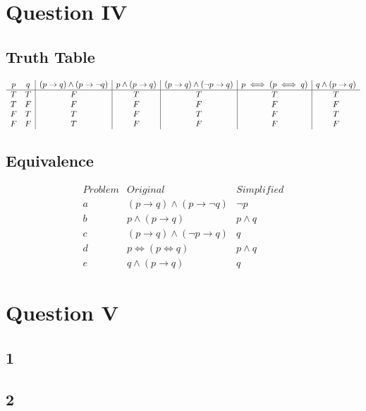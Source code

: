\documentclass{article}
\begin{document}
\section*{Question IV}

\subsection*{Truth Table}
\begin{displaymath}
\begin{array}{c c|c|c|c|c|c} %
p & q & 
(p \rightarrow q) \land (p \rightarrow \neg q) & 
p \land (p \rightarrow q) & 
(p \rightarrow q) \land (\neg p \rightarrow q) &
p \iff (p \iff q) &
q \land (p \rightarrow q)
\\ 
\hline
T & T & F & T & T & T & T \\
T & F & F & F & F & F & F \\
F & T & T & F & T & F & T \\
F & F & T & F & F & F & F 
\end{array}
\end{displaymath}

\subsection*{Equivalence}
\begin{displaymath}
\begin{array}{c|c|c} %
Problem & Original & Simplified \\
\hline
a & (p \rightarrow q) \land (p \rightarrow \neg q) & \neg p \\ 
b & p \land (p \rightarrow q) & p \land q \\
c & (p \rightarrow q) \land (\neg p \rightarrow q) & q \\
d & p \iff (p \iff q) & p \land q \\
e & q \land (p \rightarrow q) & q
\end{array}
\end{displaymath}

\section*{Question V}

\subsection{1}

\subsection{2}
\end{document}
